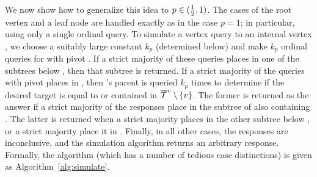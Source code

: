 We now show how to generalize this idea to $p \in (\Half, 1)$.
The cases of the root vertex and a leaf node are handled exactly as in
the case $p = 1$; in particular, using only a single ordinal query.
To simulate a vertex query to an internal vertex \Vertex,
we choose a suitably large constant $k_p$ (determined below)
and make $k_p$ ordinal queries for \ElS with pivot \Vertex.
If a strict majority of these queries
places \ElS in one of the subtrees below \Vertex,
then that subtree is returned.
If a strict majority of the queries with pivot \Vertex places \ElS in
\Subtree{\Vertex}, then \Vertex's parent \VertexP 
is queried $k_p$ times to determine
if the desired target is equal to \Vertex or contained in
$\Subtree{\Vertex} \setminus \Set{\Vertex}$.
The former is returned as the answer if a strict majority of the responses
place \ElS in the subtree of \VertexP also containing \Vertex.
The latter is returned when a strict majority places \ElS in the other
subtree below \VertexP, or a strict majority place it in
\Subtree{\VertexP}.
Finally, in all other cases, the responses are inconclusive,
and the simulation algorithm returns an arbitrary response.
Formally, the algorithm
(which has a number of tedious case distinctions)
is given as Algorithm~\ref{alg:simulate}.


